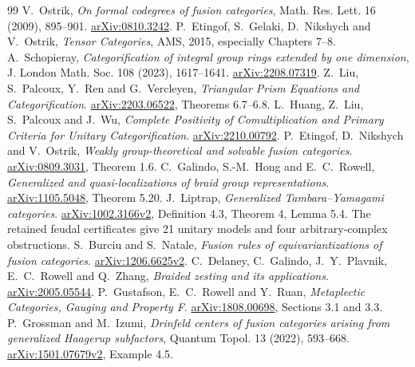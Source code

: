 \documentclass[11pt]{article}
\begin{document}
\begin{thebibliography}{99}\footnotesize\setlength{\itemsep}{2pt}\setlength{\parskip}{0pt}
 V.~Ostrik, \emph{On formal codegrees of fusion categories}, Math. Res. Lett. 16 (2009), 895--901. \href{https://arxiv.org/abs/0810.3242}{arXiv:0810.3242}.
 P.~Etingof, S.~Gelaki, D.~Nikshych and V.~Ostrik, \emph{Tensor Categories}, AMS, 2015, especially Chapters 7--8.
 A.~Schopieray, \emph{Categorification of integral group rings extended by one dimension}, J. London Math. Soc. 108 (2023), 1617--1641. \href{https://arxiv.org/abs/2208.07319}{arXiv:2208.07319}.
 Z.~Liu, S.~Palcoux, Y.~Ren and G.~Vercleyen, \emph{Triangular Prism Equations and Categorification}. \href{https://arxiv.org/abs/2203.06522}{arXiv:2203.06522}, Theorems 6.7--6.8.
 L.~Huang, Z.~Liu, S.~Palcoux and J.~Wu, \emph{Complete Positivity of Comultiplication and Primary Criteria for Unitary Categorification}. \href{https://arxiv.org/abs/2210.00792}{arXiv:2210.00792}.
 P.~Etingof, D.~Nikshych and V.~Ostrik, \emph{Weakly group-theoretical and solvable fusion categories}. \href{https://arxiv.org/abs/0809.3031}{arXiv:0809.3031}, Theorem 1.6.
 C.~Galindo, S.-M.~Hong and E.~C.~Rowell, \emph{Generalized and quasi-localizations of braid group representations}. \href{https://arxiv.org/abs/1105.5048}{arXiv:1105.5048}, Theorem 5.20.
 J.~Liptrap, \emph{Generalized Tambara--Yamagami categories}. \href{https://arxiv.org/abs/1002.3166v2}{arXiv:1002.3166v2}, Definition 4.3, Theorem 4, Lemma 5.4. The retained feudal certificates give 21 unitary models and four arbitrary-complex obstructions.
 S.~Burciu and S.~Natale, \emph{Fusion rules of equivariantizations of fusion categories}. \href{https://arxiv.org/abs/1206.6625v2}{arXiv:1206.6625v2}.
 C.~Delaney, C.~Galindo, J.~Y.~Plavnik, E.~C.~Rowell and Q.~Zhang, \emph{Braided zesting and its applications}. \href{https://arxiv.org/abs/2005.05544}{arXiv:2005.05544}.
 P.~Gustafson, E.~C.~Rowell and Y.~Ruan, \emph{Metaplectic Categories, Gauging and Property F}. \href{https://arxiv.org/abs/1808.00698}{arXiv:1808.00698}, Sections 3.1 and 3.3.
 P.~Grossman and M.~Izumi, \emph{Drinfeld centers of fusion categories arising from generalized Haagerup subfactors}, Quantum Topol. 13 (2022), 593--668. \href{https://arxiv.org/abs/1501.07679v2}{arXiv:1501.07679v2}, Example 4.5.
\end{thebibliography}
\end{document}
